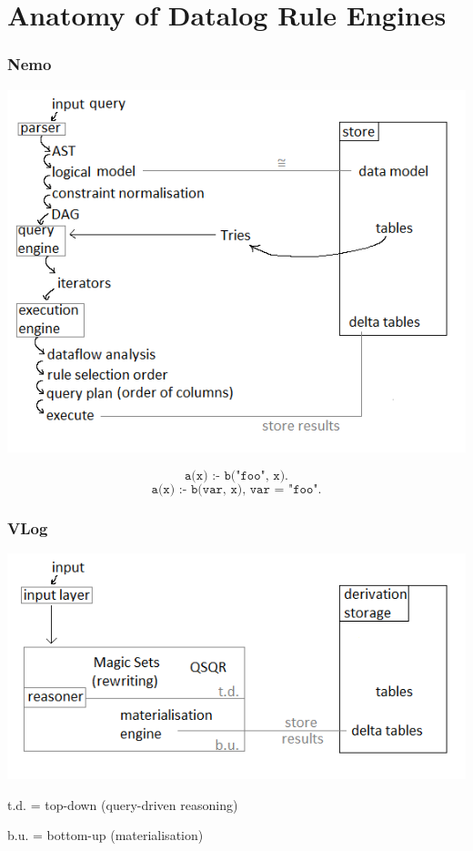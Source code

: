 \documentclass[aspectratio=169]{beamer}
\begin{document}
\section{Anatomy of Datalog Rule Engines}

\begin{frame}
	\frametitle{Nemo}
	 {
		\begin{center}
		\includegraphics[scale=.5]{figures/nemo.png}
		\end{center}
	}
	 {
		\[ \texttt{a(x) :- b("foo", x).} \]
		\[ \texttt{a(x) :- b(var, x), var = "foo".} \]
	}
\end{frame}

\begin{frame}
	\frametitle{VLog}
	\begin{center}
	\includegraphics[scale=.6]{figures/vlog.png}
	\end{center}
	\vspace{1em}
		t.d. = top-down (query-driven reasoning)
		
		b.u. = bottom-up (materialisation)
\end{frame}
\end{document}

